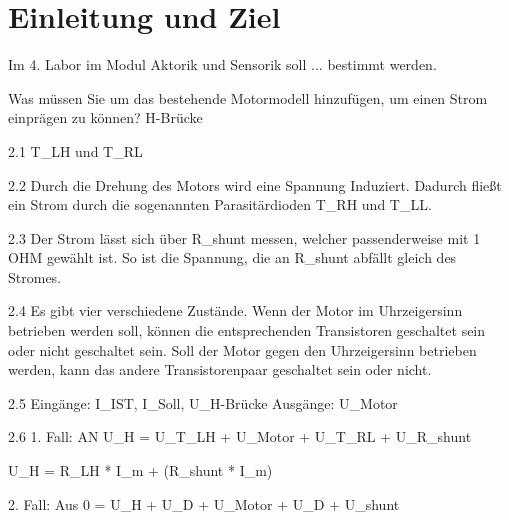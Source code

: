 \section{Einleitung und Ziel}

Im 4. Labor im Modul Aktorik und Sensorik soll ... bestimmt werden.


Was müssen Sie um das bestehende Motormodell hinzufügen, um einen Strom einprägen zu können?
H-Brücke

2.1
T_LH und T_RL

2.2 
Durch die Drehung des Motors wird eine Spannung Induziert. Dadurch fließt ein Strom durch die 
sogenannten Parasitärdioden T_RH und T_LL. 

2.3
Der Strom lässt sich über R_shunt messen, welcher passenderweise mit 1 OHM gewählt ist. So ist
die Spannung, die an R_shunt abfällt gleich des Stromes.

2.4
Es gibt vier verschiedene Zustände. Wenn der Motor im Uhrzeigersinn betrieben werden soll, können
die entsprechenden Transistoren geschaltet sein oder nicht geschaltet sein. Soll der Motor gegen
den Uhrzeigersinn betrieben werden, kann das andere Transistorenpaar geschaltet sein oder nicht.

2.5
Eingänge: I_IST, I_Soll, U_H-Brücke
Ausgänge: U_Motor

2.6
1. Fall: AN
    U_H = U_T_LH + U_Motor + U_T_RL + U_R_shunt

    U_H = R_LH * I_m + (R_shunt * I_m)  

2. Fall: Aus
    0 = U_H + U_D + U_Motor + U_D + U_shunt